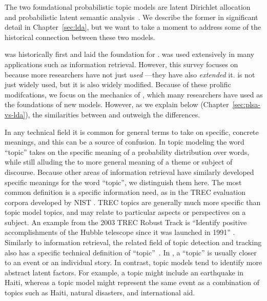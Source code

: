 The two foundational probabilistic topic models are latent Dirichlet
allocation~\citep[]{blei-03} and probabilistic latent
semantic analysis~\citep[\plsa{}]{hofmann-99}.  We describe the
former in significant detail in Chapter~\ref{sec:lda}, but we want to
take a moment to address some of the historical connection between
these two models.

\plsa{} was historically first and laid the foundation for .
\plsa{} was used extensively in many applications such as information
retrieval.  However, this survey focuses on  because more
researchers have not just \emph{used} ---they have also
\emph{extended} it.   is not just widely used, but it is also
widely modified.  Because of these prolific modifcations, we focus on the mechanics of , which many
researchers have used as the foundations of new models.  However, as
we explain below (Chapter~\ref{sec:plsa-vs-lda}), the similarities
between \plsa{} and  outweigh the differences.


In any technical field it is common for general terms to take on specific, concrete meanings, and this can be a source of confusion.
In topic modeling the word ``topic'' takes on the specific meaning of a probability distribution over words, while still alluding the to more general meaning of a theme or subject of discourse.
Because other areas of information retrieval have similarly developed
specific meanings for the word ``topic'', we distinguish them here.
The most common definition is a specific information need, as in the TREC evaluation corpora developed by NIST \citep{voorhees-05}.
TREC topics are generally much more specific than topic model topics, and may relate to particular aspects or perspectives on a subject.
An example from the 2003 TREC Robust Track is ``Identify positive accomplishments of the Hubble telescope since it was launched in 1991'' \citep{voorhees2003overview}.
Similarly to information retrieval, the related field of topic detection and tracking also has a specific technical definition of ``topic''~\citep{allan-02}.
In , a ``topic'' is usually closer to an event or an individual story.
In contrast, topic models tend to identify more abstract latent factors.
For example, a  topic might include an earthquake in Haiti, whereas a topic model might represent the same event as a combination of topics such as Haiti, natural disasters, and international aid.


